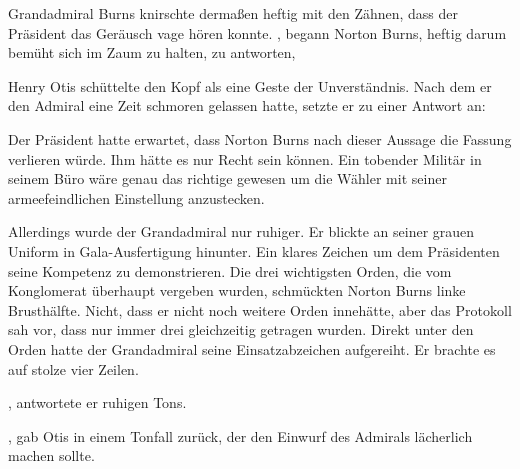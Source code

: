 Grandadmiral Burns knirschte dermaßen heftig mit den Zähnen, dass der Präsident das Geräusch vage hören konnte. , begann Norton Burns, heftig darum bemüht sich im Zaum zu halten, zu antworten, 

\par

Henry Otis schüttelte den Kopf als eine Geste der Unverständnis. Nach dem er den Admiral eine Zeit schmoren gelassen hatte, setzte er zu einer Antwort an: 

\par

Der Präsident hatte erwartet, dass Norton Burns nach dieser Aussage die Fassung verlieren würde. Ihm hätte es nur Recht sein können. Ein tobender Militär in seinem Büro wäre genau das richtige gewesen um die Wähler mit seiner armeefeindlichen Einstellung anzustecken.

\par

Allerdings wurde der Grandadmiral nur ruhiger. Er blickte an seiner grauen Uniform in Gala-Ausfertigung hinunter. Ein klares Zeichen um dem Präsidenten seine Kompetenz zu demonstrieren. Die drei wichtigsten Orden, die vom Konglomerat überhaupt vergeben wurden, schmückten Norton Burns linke Brusthälfte. Nicht, dass er nicht noch weitere Orden innehätte, aber das Protokoll sah vor, dass nur immer drei gleichzeitig getragen wurden. Direkt unter den Orden hatte der Grandadmiral seine Einsatzabzeichen aufgereiht. Er brachte es auf stolze vier Zeilen.

\par

, antwortete er ruhigen Tons. 

\par

, gab Otis in einem Tonfall zurück, der den Einwurf des Admirals lächerlich machen sollte.

